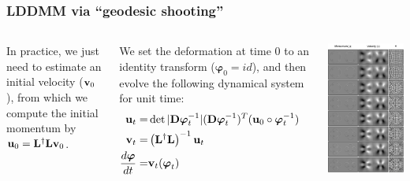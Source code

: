 \begin{frame}
\frametitle{LDDMM via ``geodesic shooting''}
\begin{columns}[c]
In practice, we just need to estimate an initial velocity (${\bf v}_0$), from which we compute the initial momentum by ${\bf u}_0 = {\bf L}^{\dagger}{\bf L}{\bf v}_0$.

We set the deformation at time 0 to an identity transform (${\boldsymbol\varphi}_0 = id$), and then evolve the following dynamical system for unit time:
\begin{eqnarray*}
{\bf u}_{t} = & \det |{\bf D}{\boldsymbol\varphi}_{t}^{-1}| ({\bf D}{\boldsymbol\varphi}_{t}^{-1})^T ({\bf u}_{0} \circ {\boldsymbol\varphi}_{t}^{-1})\cr
{\bf v}_{t} = & \left({\bf L}^{\dagger}{\bf L}\right)^{-1} {\bf u}_t\cr
\frac{d {\boldsymbol\varphi}}{d t} = & {\bf v}_t ({\boldsymbol\varphi}_t)
\end{eqnarray*}
\begin{center}
\includegraphics[width=1\textwidth]{evolution1}

\end{center}
\end{columns}
\end{frame}
